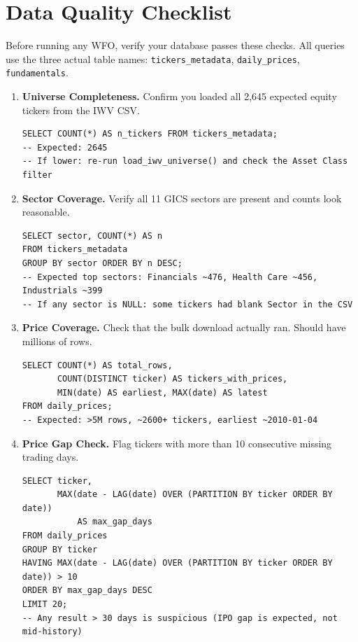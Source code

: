 \documentclass[11pt, oneside]{book}
\begin{document}
\chapter{Data Quality Checklist}

Before running any WFO, verify your database passes these checks. All queries use the three actual table names: \texttt{tickers\_metadata}, \texttt{daily\_prices}, \texttt{fundamentals}.

\begin{enumerate}[leftmargin=*, label=\textbf{Check \arabic*.}]
    \item \textbf{Universe Completeness.} Confirm you loaded all 2,645 expected equity tickers from the IWV CSV.
    \begin{lstlisting}[style=sqlstyle]
SELECT COUNT(*) AS n_tickers FROM tickers_metadata;
-- Expected: 2645
-- If lower: re-run load_iwv_universe() and check the Asset Class filter
    \end{lstlisting}

    \item \textbf{Sector Coverage.} Verify all 11 GICS sectors are present and counts look reasonable.
    \begin{lstlisting}[style=sqlstyle]
SELECT sector, COUNT(*) AS n
FROM tickers_metadata
GROUP BY sector ORDER BY n DESC;
-- Expected top sectors: Financials ~476, Health Care ~456, Industrials ~399
-- If any sector is NULL: some tickers had blank Sector in the CSV
    \end{lstlisting}

    \item \textbf{Price Coverage.} Check that the bulk download actually ran. Should have millions of rows.
    \begin{lstlisting}[style=sqlstyle]
SELECT COUNT(*) AS total_rows,
       COUNT(DISTINCT ticker) AS tickers_with_prices,
       MIN(date) AS earliest, MAX(date) AS latest
FROM daily_prices;
-- Expected: >5M rows, ~2600+ tickers, earliest ~2010-01-04
    \end{lstlisting}

    \item \textbf{Price Gap Check.} Flag tickers with more than 10 consecutive missing trading days.
    \begin{lstlisting}[style=sqlstyle]
SELECT ticker,
       MAX(date - LAG(date) OVER (PARTITION BY ticker ORDER BY date))
           AS max_gap_days
FROM daily_prices
GROUP BY ticker
HAVING MAX(date - LAG(date) OVER (PARTITION BY ticker ORDER BY date)) > 10
ORDER BY max_gap_days DESC
LIMIT 20;
-- Any result > 30 days is suspicious (IPO gap is expected, not mid-history)
    \end{lstlisting}


\end{enumerate}
\end{document}
